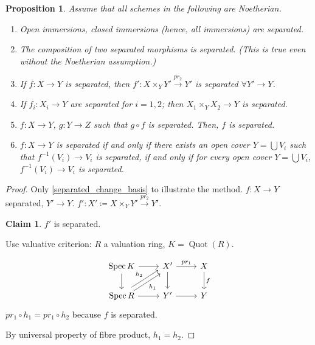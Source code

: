 \documentclass[12pt]{article}
\DeclareMathOperator{\Spec}{Spec}
\DeclareMathOperator{\Quot}{Quot}
\newtheorem*{proposition}{Proposition}
\theoremstyle{definition}
\newtheorem*{claim}{Claim}
\begin{document}
\begin{proposition}
Assume that all schemes in the following are Noetherian.

\begin{enumerate}[label=\arabic*)]
\item Open immersions, closed immersions (hence, all immersions) are separated.

\item The composition of two separated morphisms is separated. (This is true even without the Noetherian assumption.)

\item\label{separated_change_basis} If $f:X\rightarrow Y$ is separated, then $f':X\times_YY'\xrightarrow{pr_2}Y'$ is separated $\forall Y'\rightarrow Y$.

\item If $f_i:X_i\rightarrow Y$ are separated for $i=1,2$; then $X_1\times_YX_2\rightarrow Y$ is separated.

\item $f:X\rightarrow Y$, $g:Y\rightarrow Z$ such that $g\circ f$ is separated. Then, $f$ is separated.

\item $f:X\rightarrow Y$ is separated if and only if there exists an open cover $Y=\bigcup V_i$ such that $f^{-1}(V_i)\rightarrow V_i$ is separated, if and only if for every open cover $Y=\bigcup V_i$, $f^{-1}(V_i)\rightarrow V_i$ is separated.
\end{enumerate}
\end{proposition}

\begin{proof}
Only \ref{separated_change_basis} to illustrate the method. $f:X\rightarrow Y$ separated, $Y'\rightarrow Y$. $f':X'\coloneqq X\times_YY'\xrightarrow{pr_2}Y'$.

\begin{claim}
$f'$ is separated.
\end{claim}

Use valuative criterion: $R$ a valuation ring, $K=\Quot(R)$.

\[\begin{tikzcd}\Spec K\arrow[r]\arrow[d]&X'\arrow[r,"pr_1"]\arrow[d]&X\arrow[d,"f"]\\\Spec R\arrow[r]\arrow[ru,shift left,"h_2"]\arrow[ru,shift right,"h_1",swap]&Y'\arrow[r]&Y\end{tikzcd}\]
$pr_1\circ h_1=pr_1\circ h_2$ because $f$ is separated.

By universal property of fibre product, $h_1=h_2$.
\end{proof}
\end{document}
